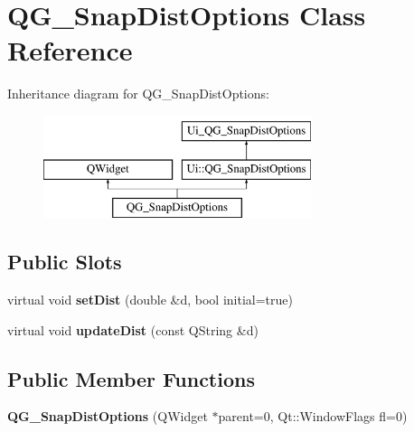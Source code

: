 \hypertarget{classQG__SnapDistOptions}{\section{Q\-G\-\_\-\-Snap\-Dist\-Options Class Reference}
\label{classQG__SnapDistOptions}
}
Inheritance diagram for Q\-G\-\_\-\-Snap\-Dist\-Options\-:\begin{figure}[H]
\begin{center}
\leavevmode
\includegraphics[height=3.000000cm]{classQG__SnapDistOptions}
\end{center}
\end{figure}
\subsection*{Public Slots}
\begin{DoxyCompactItemize}
\item 
\hypertarget{classQG__SnapDistOptions_abf6e48f6430eff5199234312ca01de7a}{virtual void {\bfseries set\-Dist} (double \&d, bool initial=true)}\label{classQG__SnapDistOptions_abf6e48f6430eff5199234312ca01de7a}

\item 
\hypertarget{classQG__SnapDistOptions_afd1a386ef71430acb49d3db8449cf2f8}{virtual void {\bfseries update\-Dist} (const Q\-String \&d)}\label{classQG__SnapDistOptions_afd1a386ef71430acb49d3db8449cf2f8}

\end{DoxyCompactItemize}
\subsection*{Public Member Functions}
\begin{DoxyCompactItemize}
\item 
\hypertarget{classQG__SnapDistOptions_a1afc0021340e2d44494ca5ffe4e3f558}{{\bfseries Q\-G\-\_\-\-Snap\-Dist\-Options} (Q\-Widget $\ast$parent=0, Qt\-::\-Window\-Flags fl=0)}\label{classQG__SnapDistOptions_a1afc0021340e2d44494ca5ffe4e3f558}

\end{DoxyCompactItemize}
